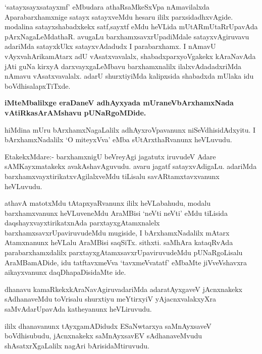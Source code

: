 \begin{artha}
`satayxsayxsatayxmf' eMbudara athaRsaMkeSxVpa nAmavilalxda Aparabarxhamxnige
  satayx satayx\-veMdu hesaru ililx parxsidadhxvAgide. modalina
  satayxshabadxkekx satf,sayxtf eMdu heVLida mUtARmUtaRrUpavAda
  pArxNagaLeMdathaR. avugaLu barxhamxsavxrUpadiMdale satayxvAgiruvavu
  adariMda satayxkUkx satayxvAdadudx I parabarxhamx. I nAmavU
  vAyxvahArikamAtarx adU vAsatxvavalalx, shabadxparxyoVgakekx
  kAraNavAda jAti guNa kirxyA darxvayxgaLeMbavu barxhamxnalilx
  ilalxvAdadadxriMda nAmavu vAsatxvavalalx. adarU shurxtiyiMda
  kalipxsida shabadxda mUlaka idu boVdhisalapxTiTxde.
\end{artha}

\begin{center}
\textbf{iMteMbalilxge eraDaneV adhAyxyada mUraneVbArxhamxNada vAtiRkasArAMshavu pUNaRgoMDide.}
\end{center}

\newpage
\centerline{}

\centerline{}

\begin{artha}
hiMdina mUru bArxhamxNagaLalilx adhAyxroVpavanunx
niSeVdhisidAdxyitu. \break I bArxhamxNadalilx `O miteyxVva' eMba sUtArxthaRvanunx heVLuvudu. 

EtakekxMdare:- barxhamxnigU beVreyAgi jagatutx iruvudeV Adare
sAMKayxmatakekx avakAshavAguvudu. avaru jagatf satayxvAdigaLu. adariMda
barxhamxvayxtirikatxvAgilalx\-veMdu tiLisalu savARtamxtavxvanunx heVLuvudu.
\end{artha}

\begin{artha}
athavA matotxMdu tAtapxyaRvanunx ililx heVLabahudu, modalu
barxhamx\-vanunx heVLuveneMdu AraMBisi `neVti neVti' eMdu tiLisida
daqshayxvayxtirikatxnAda parxtayxgAtamx\-nalelx
barxhamxsavxrUpaviruvudeMdu mugiside, I bArxhamxNadalilx mAtarx
Atamxnanunx heVLalu AraMBisi saqSiTx. sithxti. saMhAra
kataqRvAda parabarxhamxdalilx parxtayxgAtamxsavxrUpaviruvu\-deMdu
pUNaRgoLisalu AraMBamADide, idu tatftavxmeVva `tavxmeVvatatf' eMbaMte
jiVveVshavxra aikayxvanunx daqDhapaDisidaMte ide.
\end{artha}

\centerline{}

\begin{artha}
dhanavu kamaRkekxkAraNavAgiruvadariMda adaratAyxgaveV jAcnxnakekx
sAdhanaveMdu toVrisalu shurxtiyu meYtirxyiV yAjacnxvalakxyXra
saMvAdarUpavAda katheyanunx heVLiruvudu.

ililx dhanavanunx tAyxgamADidudx ESaNwtarxya saMnAyxsaveV
boVdhisubudu, jAcnxnakekx saMnAyxsavEV sAdhanaveMvudu
shAsatxrXgaLalilx nagAri bArisidaMtiruvudu.
\end{artha}

